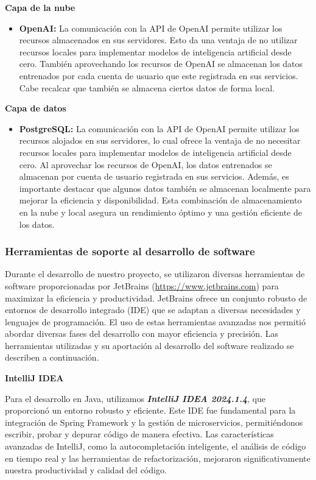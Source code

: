 \textbf{Capa de la nube}

\begin{itemize}
	\item \textbf{OpenAI:} La comunicación con la API de OpenAI permite utilizar los recursos almacenados en sus servidores. Esto da una ventaja de no utilizar recursos locales para implementar modelos de inteligencia artificial desde cero. También aprovechando los recursos de OpenAI se almacenan los datos entrenados por cada cuenta de usuario que este registrada en sus servicios. Cabe recalcar que también se almacena ciertos datos de forma local. 
\end{itemize}

\textbf{Capa de datos}

\begin{itemize}
	\item \textbf{PostgreSQL:} La comunicación con la API de OpenAI permite utilizar los recursos alojados en sus servidores, lo cual ofrece la ventaja de no necesitar recursos locales para implementar modelos de inteligencia artificial desde cero. Al aprovechar los recursos de OpenAI, los datos entrenados se almacenan por cuenta de usuario registrada en sus servicios. Además, es importante destacar que algunos datos también se almacenan localmente para mejorar la eficiencia y disponibilidad. Esta combinación de almacenamiento en la nube y local asegura un rendimiento óptimo y una gestión eficiente de los datos.
\end{itemize}


\subsubsection{Herramientas de soporte al desarrollo de software}

Durante el desarrollo de nuestro proyecto, se utilizaron diversas herramientas de software proporcionadas por JetBrains (\url{https://www.jetbrains.com}) para maximizar la eficiencia y productividad. JetBrains ofrece un conjunto robusto de entornos de desarrollo integrado (IDE) que se adaptan a diversas necesidades y lenguajes de programación. El uso de estas herramientas avanzadas nos permitió abordar diversas fases del desarrollo con mayor eficiencia y precisión. Las herramientas utilizadas y su aportación al desarrollo del software realizado se describen a continuación.

\textbf{IntelliJ IDEA}

Para el desarrollo en Java, utilizamos \textbf{\textit{IntelliJ IDEA 2024.1.4}}, que proporcionó un entorno robusto y eficiente. Este IDE fue fundamental para la integración de Spring Framework y la gestión de microservicios, permitiéndonos escribir, probar y depurar código de manera efectiva. Las características avanzadas de IntelliJ, como la autocompletación inteligente, el análisis de código en tiempo real y las herramientas de refactorización, mejoraron significativamente nuestra productividad y calidad del código.

